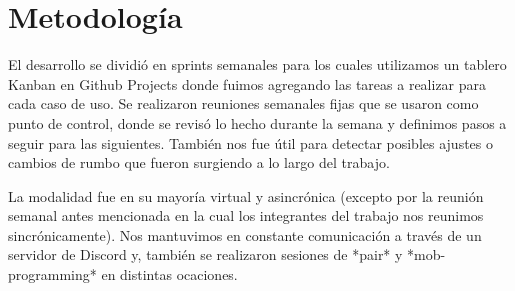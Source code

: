 \section{Metodología}

El desarrollo se dividió en sprints semanales para los cuales utilizamos un tablero Kanban en Github Projects donde fuimos agregando las tareas a realizar para cada caso de uso. Se realizaron reuniones semanales fijas que se usaron como punto de control, donde se revisó lo hecho durante la semana y definimos pasos a seguir para las siguientes. También nos fue útil para detectar posibles ajustes o cambios de rumbo que fueron surgiendo a lo largo del trabajo.

La modalidad fue en su mayoría virtual y asincrónica (excepto por la reunión semanal antes
mencionada en la cual los integrantes del trabajo nos reunimos sincrónicamente). Nos mantuvimos en constante comunicación a través de un servidor de Discord y, también se realizaron sesiones de *pair* y *mob-programming* en distintas ocaciones.